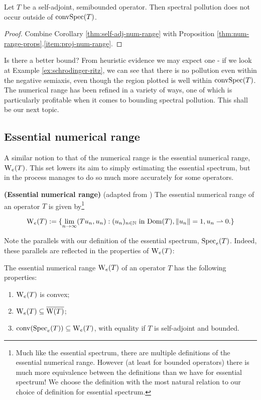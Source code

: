 \documentclass[../main.tex]{subfiles}
\begin{document}
\begin{corollary}
  Let $T$ be a self-adjoint, semibounded operator.
  Then spectral pollution does not occur outside of $\mathrm{conv}\mathrm{Spec}(T)$.
\end{corollary}
\begin{proof}
Combine Corollary \ref{thm:self-adj-num-range} with Proposition
\ref{thm:num-range-props}.\ref{item:proj-num-range}. 
\end{proof}

Is there a better bound? From heuristic evidence we may expect one - if we look
at Example \ref{ex:schrodinger-ritz}, we can see that there is no pollution even
within the negative semiaxis, even though the region plotted is well within
$\mathrm{conv}\mathrm{Spec}(T)$. The numerical range has been refined in a variety
of ways, one of which is particularly profitable when it comes to bounding
spectral pollution. This shall be our next topic.

\subsection{Essential numerical range}
A similar notion to that of the numerical range is the essential numerical
range, $\mathrm{W}_e (T)$. This set lowers its aim to simply estimating the essential
spectrum, but in the process manages to do so much more accurately for some
operators.

\begin{definition}{\textbf{(Essential numerical range)}} 
  (adapted from \cite{fillmore1972essential})
  The essential numerical range of an operator $T$ is given by\footnote{Much like
  the essential spectrum, there are multiple definitions of the essential
  numerical range. However (at least for bounded operators) there is much
  more equivalence between the definitions than we have for essential
  spectrum! \cite{fillmore1972essential} We choose the definition with the
  most natural relation to our choice of definition for essential spectrum.}

$$\mathrm{W}_e (T) := \{\lim_{n \rightarrow \infty}( Tu_n, u_n ) 
		  : (u_n)_{n \in \mathbb{N}}\text{ in } \mathrm{Dom}(T), \|u_n\|=1,
		    u_n \rightharpoonup 0.\}$$
\end{definition}
Note the parallels with our definition of the essential spectrum, $\mathrm{Spec}_e(T)$.
Indeed, these parallels are reflected in the properties of $\mathrm{W}_e(T)$:

\begin{proposition}
\label{thm:nume-props}
  The essential numerical range $\mathrm{W}_e(T)$ of an operator $T$ has the following properties:
  \begin{enumerate}
    \item
    \label{item:nume-convex} 
      $\mathrm{W}_e(T)$ is convex;
    \item
    \label{item:nume-in-clos-num} 
      $\mathrm{W}_e(T) \subseteq \overline{\mathrm{W}(T)}$;
    \item
    \label{item:nume-is-hull} 
      $\mathrm{conv}(\mathrm{Spec}_e(T)) \subseteq \mathrm{W}_e(T)$, with equality if $T$ is self-adjoint and bounded.
\end{enumerate}
\end{proposition}
\end{document}
